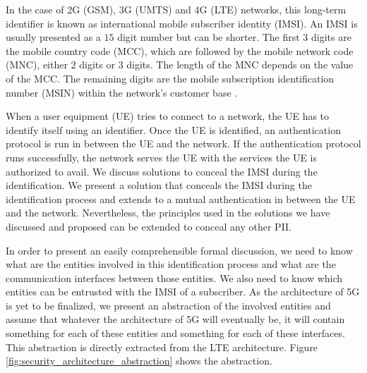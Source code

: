 \documentclass[runningheads,a4paper]{llncs} %
\begin{document}
In the case of 2G (GSM), 3G (UMTS) and 4G (LTE) networks, this long-term identifier is known as international mobile subscriber identity (IMSI). An IMSI is usually presented as a $15$ digit number but can be shorter. The first $3$ digits are the mobile country code (MCC), which are followed by the mobile network code (MNC), either $2$ digits or $3$ digits. The length of the MNC depends on the value of the MCC. The remaining digits are the mobile subscription identification number (MSIN) within the network's customer base \cite{TS23003}. 

When a user equipment (UE) tries to connect to a network, the UE has to identify itself using an identifier. Once the UE is identified, an authentication protocol is run in between the UE and the network. If the authentication protocol runs successfully, the network serves the UE with the services the UE is authorized to avail. We discuss solutions to conceal the IMSI during the identification. We present a solution that conceals the IMSI during the identification process and extends to a mutual authentication in between the UE and the network. Nevertheless, the principles used in the solutions we have discussed and proposed can be extended to conceal any other PII. 

In order to present an easily comprehensible formal discussion, we need to know what are the entities involved in this identification process and what are the communication interfaces between those entities. We also need to know which entities can be entrusted with the IMSI of a subscriber. As the architecture of 5G is yet to be finalized, we present an abstraction of the involved entities and assume that whatever the architecture of 5G will eventually be, it will contain something for each of these entities and something for each of these interfaces. This abstraction is directly extracted from the LTE architecture. Figure \ref{fig:security_architecture_abstraction} shows the abstraction.
\end{document}
